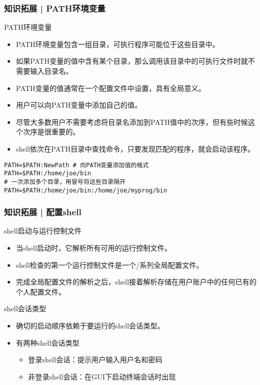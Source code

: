 \begin{frame}[fragile]
  \frametitle{知识拓展 | PATH环境变量}
  \vspace{-0.5em}
  \begin{block}{PATH环境变量}
    \begin{itemize}
      \item PATH环境变量包含一组目录，可执行程序可能位于这些目录中。
      \item 如果PATH变量的值中含有某个目录，那么调用该目录中的可执行文件时就不需要输入目录名。
      \item PATH变量的值通常在一个配置文件中设置，具有全局意义。
      \item 用户可以向PATH变量中添加自己的值。
      \item 尽管大多数用户不需要考虑将目录名添加到PATH值中的次序，但有些时候这个次序是很重要的。
      \item shell依次在PATH目录中查找命令，只要发现匹配的程序，就会启动该程序。
    \end{itemize}
  \end{block}
  \pause
  \vspace{-1.8em}
\begin{lstlisting}
PATH=$PATH:NewPath # 向PATH变量添加值的格式
PATH=$PATH:/home/joe/bin
# 一次添加多个目录，用冒号将这些目录隔开
PATH=$PATH:/home/joe/bin:/home/joe/myprog/bin
\end{lstlisting}
\end{frame}

\begin{frame}
  \frametitle{知识拓展 | 配置shell}
  \begin{block}{shell启动与运行控制文件}
    \begin{itemize}
      \item 当shell启动时，它解析所有可用的运行控制文件。
      \item shell检查的第一个运行控制文件是一个/系列全局配置文件。
      \item 完成全局配置文件的解析之后，shell接着解析存储在用户账户中的任何已有的个人配置文件。
    \end{itemize}
  \end{block}
  \pause
  \begin{block}{shell会话类型}
    \begin{itemize}
      \item 确切的启动顺序依赖于要运行的shell会话类型。
      \item 有两种shell会话类型
        \begin{itemize}
          \item 登录shell会话：提示用户输入用户名和密码
          \item 非登录shell会话：在GUI下启动终端会话时出现
        \end{itemize}
    \end{itemize}
  \end{block}
\end{frame}

